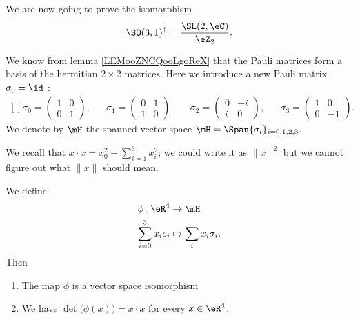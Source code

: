 We are now going to prove the isomorphism
\begin{equation}
    \SO(3,1)^{\uparrow}=\frac{ \SL(2,\eC) }{ \eZ_2 }.
\end{equation}

We know from lemma \ref{LEMooZNCQooLgoReX} that the Pauli matrices form a basis of the hermitian \( 2\times 2\) matrices. Here we introduce a new Pauli matrix \( \sigma_0=\id\) :
\begin{equation}
    \begin{aligned}[]
        \sigma_0=\begin{pmatrix}
            1    &   0    \\ 
            0    &   1    
        \end{pmatrix},&&
        \sigma_1=\begin{pmatrix}
            0    &   1    \\ 
            1    &   0    
        \end{pmatrix},&&
        \sigma_2=\begin{pmatrix}
            0    &   -i    \\ 
            i    &   0    
        \end{pmatrix},&&
        \sigma_3=\begin{pmatrix}
            1    &   0    \\ 
            0    &   -1    
        \end{pmatrix}.
    \end{aligned}
\end{equation}
We denote by \( \mH\) the spanned vector space \( \mH=\Span\{ \sigma_i \}_{i=0,1,2,3}\).

\begin{normaltext}
    We recall that \( x\cdot x=x_0^2-\sum_{i=1}^3x_i^2\); we could write it as \( \| x \|^2\) but we cannot figure out what \( \| x \| \) should mean.
\end{normaltext}

\begin{lemma}       \label{LEMooXKHYooFTzHhg}
    We define
    \begin{equation}
        \begin{aligned}
            \phi\colon \eR^4&\to \mH \\
            \sum_{i=0}^3x_ie_i&\mapsto \sum_ix_i\sigma_i. 
        \end{aligned}
    \end{equation}
    Then
    \begin{enumerate}
        \item
            The map \( \phi\) is a vector space isomorphism
        \item       \label{ITEMooISFKooItVpre}
            We have \( \det\big( \phi(x) \big)=x\cdot x\) for every \( x\in \eR^4\).
    \end{enumerate}
\end{lemma}

